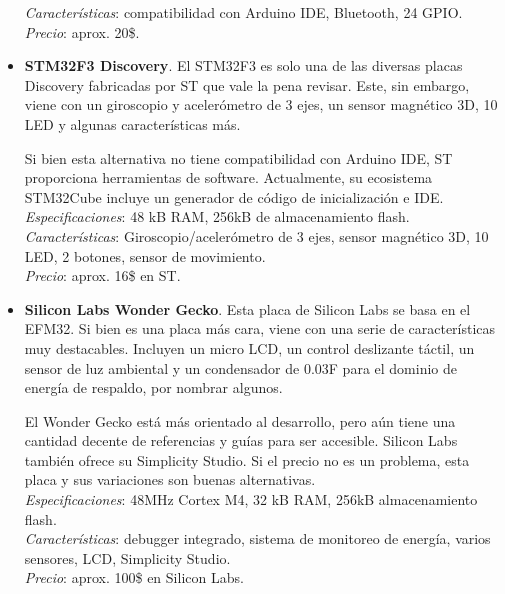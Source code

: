 \documentclass[12pt]{article}
\begin{document}
\begin{itemize}
		\textit{Características}: compatibilidad con Arduino IDE, Bluetooth, 24 GPIO.\\
		
		\textit{Precio}: aprox. 20\$.\\
		
		\item \textbf{STM32F3 Discovery}. El STM32F3 es solo una de las diversas placas Discovery fabricadas por ST que vale la pena revisar. Este, sin embargo, viene con un giroscopio y acelerómetro de 3 ejes, un sensor magnético 3D, 10 LED y algunas características más.
		
		Si bien esta alternativa no tiene compatibilidad con Arduino IDE, ST proporciona herramientas de software. Actualmente, su ecosistema STM32Cube incluye un generador de código de inicialización e IDE. \\
		
		\textit{Especificaciones}: 48 kB RAM, 256kB de almacenamiento flash.\\
		
		\textit{Características}: Giroscopio/acelerómetro de 3 ejes, sensor magnético 3D, 10 LED, 2 botones, sensor de movimiento.\\
		
		\textit{Precio}: aprox. 16\$ en ST.
		\\
		
		\item \textbf{Silicon Labs Wonder Gecko}. Esta placa de Silicon Labs se basa en el EFM32. Si bien es una placa más cara, viene con una serie de características muy destacables. Incluyen un micro LCD, un control deslizante táctil, un sensor de luz ambiental y un condensador de 0.03F para el dominio de energía de respaldo, por nombrar algunos.
		
		El Wonder Gecko está más orientado al desarrollo, pero aún tiene una cantidad decente de referencias y guías para ser accesible. Silicon Labs también ofrece su Simplicity Studio. Si el precio no es un problema, esta placa y sus variaciones son buenas alternativas. \\
		
		\textit{Especificaciones}: 48MHz Cortex M4, 32 kB RAM, 256kB almacenamiento flash.\\
		
		\textit{Características}: debugger integrado, sistema de monitoreo de energía, varios sensores, LCD, Simplicity Studio.\\
		
		\textit{Precio}: aprox.  100\$ en Silicon Labs.\\
		

\end{itemize}
\end{document}
